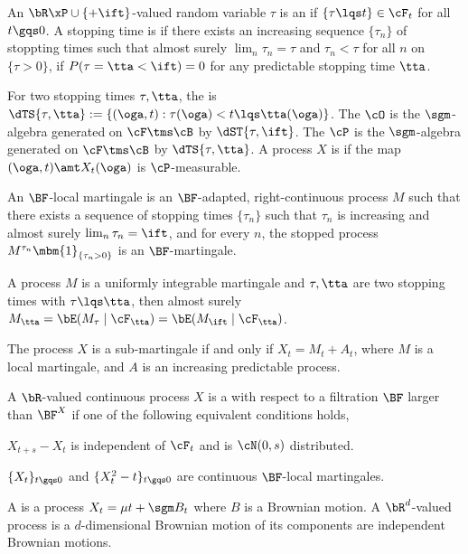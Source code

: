\documentclass[article, a4paper, twoside]{universal}
\begin{document}
\begin{dfn}[1.2.3.1]
    An $\bR\xP\cup\{+\ift\}$-valued random variable $\tau$ is an  if $\{\tau\lqs t\}\in\cF_{t}$ for all $t\gqs0$. A stopping time is  if there exists an increasing sequence $\{\tau_{n}\}$ of stoppting times such that almost surely $\lim_{n}\tau_{n}=\tau$ and $\tau_{n}<\tau$ for all $n$ on $\{\tau>0\}$,  if $P(\tau=\tta<\ift)=0$ for any predictable stopping time $\tta$.

    For two stopping times $\tau,\tta$, the  is $\dTS{\tau,\tta}:=\{(\oga,t):\tau(\oga)<t\lqs\tta(\oga)\}$. The  $\cO$ is the $\sgm$-algebra generated on $\cF\tms\cB$ by $\dST{\tau,\ift}$. The  $\cP$ is the $\sgm$-algebra generated on $\cF\tms\cB$ by $\dTS{\tau,\tta}$. A process $X$ is  if the map $(\oga,t)\amt X_{t}(\oga)$ is $\cP$-measurable.
\end{dfn}

\begin{dfn}[1.2.4.1]
    An $\BF$-local martingale is an $\BF$-adapted, right-continuous process $M$ such that there exists a sequence of stopping times $\{\tau_{n}\}$ such that $\tau_{n}$ is increasing and almost surely $\lim_{n}\tau_{n}=\ift$, and for every $n$, the stopped process $M^{\tau_{n}}\mbm{1}_{\{\tau_{n}>0\}}$ is an $\BF$-martingale.
\end{dfn}

\begin{thm}
    A process $M$ is a uniformly integrable martingale and $\tau,\tta$ are two stopping times with $\tau\lqs\tta$, then almost surely $M_{\tta}=\bE(M_{\tau}\mid\cF_{\tta})=\bE(M_{\ift}\mid\cF_{\tta})$.
\end{thm}

\begin{thm}
    The process $X$ is a sub-martingale if and only if $X_{t}=M_{t}+A_{t}$, where $M$ is a local martingale, and $A$ is an increasing predictable process.
\end{thm}

\begin{dfn}[1.4.1.1, 1.4.1.2, 1.4.1.4]
    A $\bR$-valued continuous process $X$ is a  with respect to a filtration $\BF$ larger than $\BF^{X}$ if one of the following equivalent conditions holds,
    \begin{itm}
        \item $X_{t+s}-X_{t}$ is independent of $\cF_{t}$ and is $\cN(0,s)$ distributed.
        \item $\{X_{t}\}_{t\gqs0}$ and $\{X_{t}^{2}-t\}_{t\gqs0}$ are continuous $\BF$-local martingales.
    \end{itm}

    A  is a process $X_{t}=\mu t+\sgm B_{t}$ where $B$ is a Brownian motion. A $\bR^{d}$-valued process is a $d$-dimensional Brownian motion of its components are independent Brownian motions.
\end{dfn}
\end{document}
